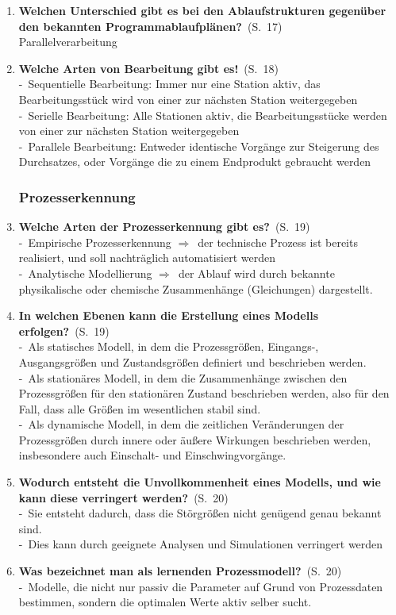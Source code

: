 \documentclass[a4paper,12pt]{article}
\newcommand{\question}[3]{\pagebreak[3]\item {\textbf{#1?}}\ (S.\ #2)#3}
\newcommand{\statement}[3]{\pagebreak[3]\item {\textbf{#1!}}\ (S.\ #2)#3}
\newcommand{\catchword}[1]{\\-\ #1}
\newcommand{\normaltext}[1]{\\#1}
\newcommand{\resultol}[1]{$\Rightarrow$\ #1}
\newcommand{\page}[1]{#1}
\begin{document}
\begin{enumerate}
  \question{Welchen Unterschied gibt es bei den Ablaufstrukturen gegenüber
            den bekannten Programmablaufplänen}{\page{17}}
  {
    \normaltext{Parallelverarbeitung}
  }

  \statement{Welche Arten von Bearbeitung gibt es}{\page{18}}
  {
    \catchword{Sequentielle Bearbeitung: Immer nur eine Station aktiv, das Bearbeitungsstück wird
               von einer zur nächsten Station weitergegeben}
    \catchword{Serielle Bearbeitung: Alle Stationen aktiv, die Bearbeitungsstücke werden von einer
               zur nächsten Station weitergegeben}
    \catchword{Parallele Bearbeitung: Entweder identische Vorgänge zur Steigerung des Durchsatzes,
               oder Vorgänge die zu einem Endprodukt gebraucht werden}
  }

  \subsubsection{Prozesserkennung}

  \question{Welche Arten der Prozesserkennung gibt es}{\page{19}}
  {
    \catchword{Empirische Prozesserkennung \resultol der technische Prozess ist bereits realisiert, und soll 
               nachträglich automatisiert werden}
    \catchword{Analytische Modellierung \resultol der Ablauf wird durch bekannte physikalische oder chemische
               Zusammenhänge (Gleichungen) dargestellt. }
  }

  \question{In welchen Ebenen kann die Erstellung eines Modells erfolgen}{\page{19}}
  {
    \catchword{Als statisches Modell, in dem die Prozessgrößen, Eingangs-, Ausgangsgrößen und Zustandsgrößen
               definiert und beschrieben werden.}
    \catchword{Als stationäres Modell, in dem die Zusammenhänge zwischen den Prozessgrößen für den stationären 
               Zustand beschrieben werden, also für den Fall, dass alle Größen im wesentlichen stabil sind.}
    \catchword{Als dynamische Modell, in dem die zeitlichen Veränderungen der Prozessgrößen durch
               innere oder äußere Wirkungen beschrieben werden, insbesondere auch Einschalt- 
               und Einschwingvorgänge.}
  }

  \question{Wodurch entsteht die Unvollkommenheit eines Modells, und wie kann diese
            verringert werden}{\page{20}}
  {
    \catchword{Sie entsteht dadurch, dass die Störgrößen nicht genügend genau bekannt sind.}
    \catchword{Dies kann durch geeignete Analysen und Simulationen verringert werden}
  }

  \question{Was bezeichnet man als lernenden Prozessmodell}{\page{20}}
  {
    \catchword{Modelle, die nicht nur passiv die Parameter auf Grund von Prozessdaten bestimmen,
               sondern die optimalen Werte aktiv selber sucht.}
  }


\end{enumerate}
\end{document}

